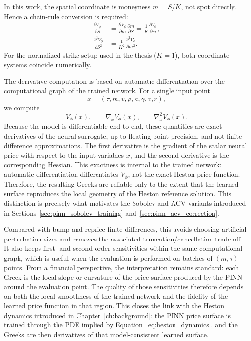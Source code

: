 In this work, the spatial coordinate is moneyness \(m=S/K\), not spot directly. Hence a chain-rule conversion is required:
\begin{align}
\frac{\partial V_\phi}{\partial S} &= \frac{\partial V_\phi}{\partial m}\frac{\partial m}{\partial S}
=\frac{1}{K}\frac{\partial V_\phi}{\partial m},\\
\frac{\partial^2 V_\phi}{\partial S^2} &= \frac{1}{K^2}\frac{\partial^2 V_\phi}{\partial m^2}.
\end{align}
For the normalized-strike setup used in the thesis (\(K=1\)), both coordinate systems coincide numerically.

The derivative computation is based on automatic differentiation over the computational graph of the trained network. For a single input point
\[
x=(\tau,m,v,\rho,\kappa,\gamma,\bar v,r),
\]
we compute
\[
V_\phi(x),\qquad \nabla_x V_\phi(x),\qquad \nabla_x^2 V_\phi(x).
\]
Because the model is differentiable end-to-end, these quantities are exact derivatives of the neural surrogate, up to floating-point precision, and not finite-difference approximations. The first derivative is the gradient of the scalar neural price with respect to the input variables \(x\), and the second derivative is the corresponding Hessian. This exactness is internal to the trained network: automatic differentiation differentiates \(V_\phi\), not the exact Heston price function. Therefore, the resulting Greeks are reliable only to the extent that the learned surface reproduces the local geometry of the Heston reference solution. This distinction is precisely what motivates the Sobolev and ACV variants introduced in Sections~\ref{sec:pinn_sobolev_training} and~\ref{sec:pinn_acv_correction}.

Compared with bump-and-reprice finite differences, this avoids choosing artificial perturbation sizes and removes the associated truncation/cancellation trade-off. It also keeps first- and second-order sensitivities within the same computational graph, which is useful when the evaluation is performed on batches of \((m,\tau)\) points. From a financial perspective, the interpretation remains standard: each Greek is the local slope or curvature of the price surface produced by the PINN around the evaluation point. The quality of those sensitivities therefore depends on both the local smoothness of the trained network and the fidelity of the learned price function in that region.
This closes the link with the Heston dynamics introduced in Chapter~\ref{ch:background}: the PINN price surface is trained through the PDE implied by Equation~\ref{eq:heston_dynamics}, and the Greeks are then derivatives of that model-consistent learned surface.
